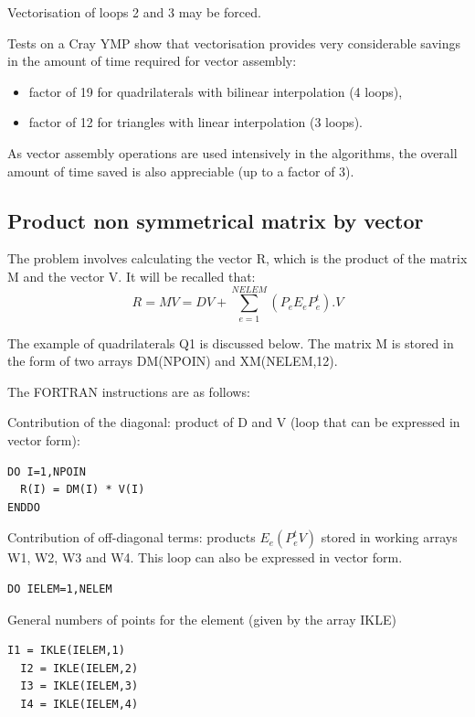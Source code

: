 Vectorisation of loops 2 and 3 may be forced.

Tests on a Cray YMP show that vectorisation provides very considerable savings
in the amount of time required for vector assembly:
\begin{itemize}
  \item factor of 19 for quadrilaterals with bilinear interpolation (4 loops),
  \item factor of 12 for triangles with linear interpolation (3 loops).
\end{itemize}

As vector assembly operations are used intensively in the algorithms, the
overall amount of time saved is also appreciable (up to a factor of 3).

\subsection{Product non symmetrical matrix by vector}

The problem involves calculating the vector R, which is the product of the
matrix M and the vector V. It will be recalled that:
\[R=MV=DV+\sum _{e=1}^{NELEM}(P_{e} E_{e} P_{e}^{t} ) .V\]

The example of quadrilaterals Q1 is discussed below. The matrix M is stored in
the form of two arrays DM(NPOIN) and XM(NELEM,12).

The FORTRAN instructions are as follows:

Contribution of the diagonal: product of D and V (loop that can be expressed in vector form):

\begin{lstlisting}[language=TelFortran]
DO I=1,NPOIN
  R(I) = DM(I) * V(I)
ENDDO
\end{lstlisting}

Contribution of off-diagonal terms: products $E_{e} (P_{e}^{t} V)$ stored in working arrays W1, W2, W3 and W4. This loop can also be expressed in vector form.

\begin{lstlisting}[language=TelFortran]
DO IELEM=1,NELEM
\end{lstlisting}

General numbers of points for the element (given by the array IKLE)

\begin{lstlisting}[language=TelFortran]
  I1 = IKLE(IELEM,1)
  I2 = IKLE(IELEM,2)
  I3 = IKLE(IELEM,3)
  I4 = IKLE(IELEM,4)
\end{lstlisting}

